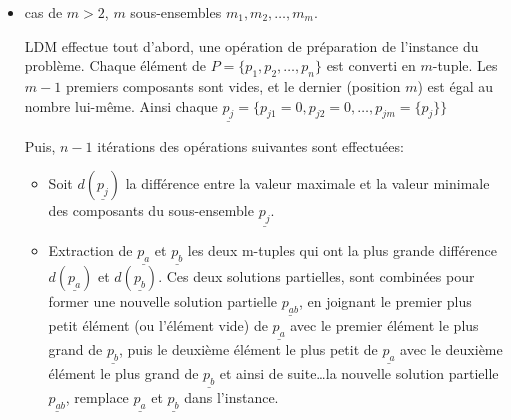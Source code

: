 \documentclass[a4paper,12pt]{report}
\theoremstyle{plain}				%
\newtheorem{example}{Exemple}
\theoremstyle{definition}				%
\begin{document}
\begin{itemize}
\begin{example}
\end{example}

\bigskip

\item cas de $m>2$, $m$ sous-ensembles $m_1,m_2, \ldots, m_m $.

%
%
  LDM effectue tout d'abord, une opération de préparation de
  l'instance du problème.
  Chaque élément de $P = \{ p_1, p_2, \ldots, p_n \}$ est converti en
  $m$-tuple.
  Les $m-1$ premiers composants sont vides, et le dernier (position $m$)
  est égal au nombre lui-même.
  Ainsi chaque
  $\underline{p_j} = \{p_{j 1}=0,p_{j 2}=0, \ldots, p_{j m}=\{p_j\}
  \}$

Puis, $n-1$ itérations des opérations suivantes sont effectuées:

\begin{itemize}
\item Soit $d(\underline{p_j})$ la différence entre la valeur maximale et la
valeur minimale des composants du sous-ensemble $\underline{p_j}$.
\item Extraction de $\underline{p_a}$ et $\underline{p_b}$ les deux m-tuples
qui ont la plus grande différence $d(\underline{p_a})$ et
$d(\underline{p_b})$.
Ces deux solutions partielles, sont combinées pour former une nouvelle
solution partielle $\underline{p_{ab}}$, en joignant le premier plus
petit élément (ou l'élément vide) de $\underline{p_a}$ avec le premier
élément le plus grand de $\underline{p_b}$, puis le deuxième élément
le plus petit de $\underline{p_a}$ avec le deuxième élément le plus
grand de $\underline{p_b}$ et ainsi de suite\ldots la nouvelle
solution partielle $\underline{p_{ab}}$, remplace $\underline{p_a}$ et
$\underline{p_b}$ dans l'instance.
\end{itemize}


\end{itemize}
\end{document}
